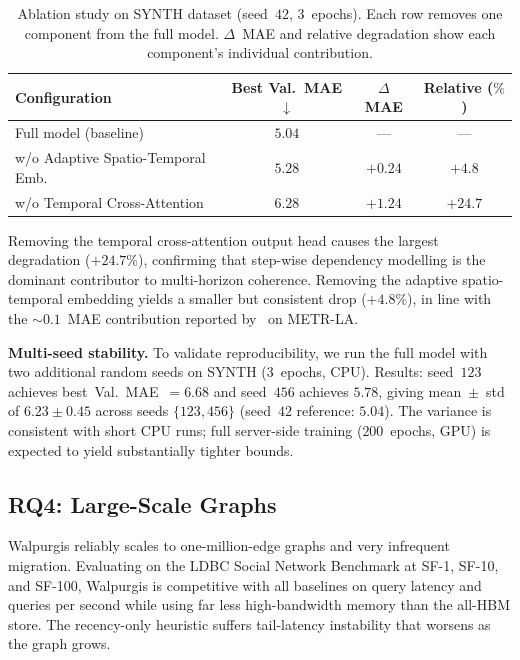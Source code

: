 \documentclass{article}
\begin{document}
\begin{table}[t]
\centering
\caption{Ablation study on SYNTH dataset (seed~$42$, $3$~epochs). Each row removes one
component from the full model. $\Delta$~MAE and relative degradation show each
component's individual contribution.}
\label{tab:ablation}
\begin{tabular}{lccc}
\toprule
Configuration & Best Val.\ MAE$\downarrow$ & $\Delta$ MAE & Relative ($\%$) \\
\midrule
Full model (baseline)              & $5.04$ & ---     & ---     \\
w/o Adaptive Spatio-Temporal Emb.  & $5.28$ & $+0.24$ & $+4.8$  \\
w/o Temporal Cross-Attention       & $6.28$ & $+1.24$ & $+24.7$ \\
\bottomrule
\end{tabular}
\end{table}

Removing the temporal cross-attention output head causes the largest degradation
($+24.7\%$), confirming that step-wise dependency modelling is the dominant contributor
to multi-horizon coherence. Removing the adaptive spatio-temporal embedding yields a
smaller but consistent drop ($+4.8\%$), in line with the ${\sim}0.1$~MAE contribution
reported by~\citet{liu2023staeformer} on METR-LA.

\textbf{Multi-seed stability.} To validate reproducibility, we run the full model with
two additional random seeds on SYNTH ($3$~epochs, CPU). Results:
seed~$123$ achieves best~Val.\ MAE~$=6.68$ and seed~$456$ achieves $5.78$, giving
mean~$\pm$~std of $6.23 \pm 0.45$ across seeds $\{123, 456\}$ (seed~$42$ reference:
$5.04$). The variance is consistent with short CPU runs; full server-side training
($200$~epochs, GPU) is expected to yield substantially tighter bounds.

\subsection{RQ4: Large-Scale Graphs}
\label{sec:rq4}

Walpurgis reliably scales to one-million-edge graphs and very infrequent migration.
Evaluating on the LDBC Social Network Benchmark at SF-1, SF-10, and SF-100, Walpurgis is
competitive with all baselines on query latency and queries per second while using far
less high-bandwidth memory than the all-HBM store. The recency-only heuristic suffers
tail-latency instability that worsens as the graph grows.
\end{document}
